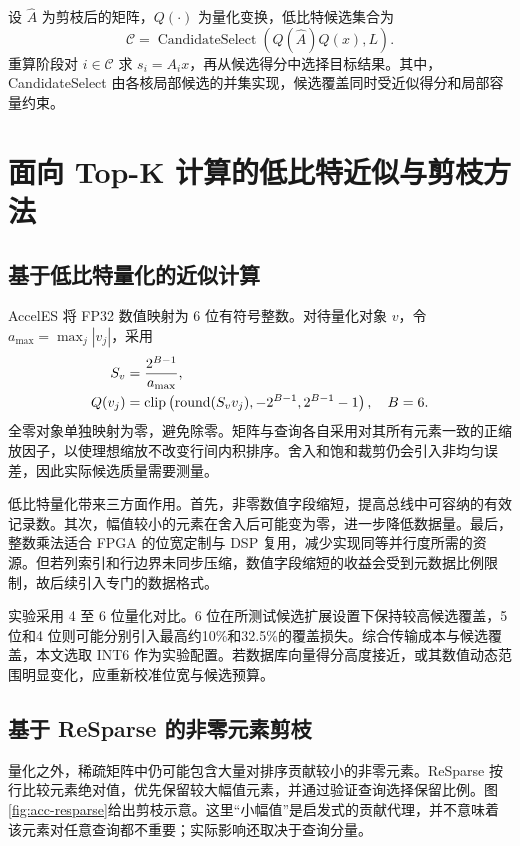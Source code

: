 设 $\widehat A$ 为剪枝后的矩阵，$Q(\cdot)$ 为量化变换，低比特候选集合为
\begin{equation}
 \mathcal{C}=\operatorname{CandidateSelect}(Q(\widehat A)Q(x),L).
\end{equation}
重算阶段对 $i\in\mathcal{C}$ 求 $s_i=A_ix$，再从候选得分中选择目标结果。其中，CandidateSelect 由各核局部候选的并集实现，候选覆盖同时受近似得分和局部容量约束。

\section{面向 Top-K 计算的低比特近似与剪枝方法}
\subsection{基于低比特量化的近似计算}
AccelES 将 FP32 数值映射为 6 位有符号整数。对待量化对象 $v$，令 $a_{\max}=\max_j|v_j|$，采用
\begin{align}
 S_v&=\frac{2^{B-1}}{a_{\max}},\\
 Q(v_j)&=\operatorname{clip}\left(\operatorname{round}(S_vv_j),-2^{B-1},2^{B-1}-1\right),\quad B=6.
 \label{eq:acc-quant}
\end{align}
全零对象单独映射为零，避免除零。矩阵与查询各自采用对其所有元素一致的正缩放因子，以使理想缩放不改变行间内积排序。舍入和饱和裁剪仍会引入非均匀误差，因此实际候选质量需要测量。

低比特量化带来三方面作用。首先，非零数值字段缩短，提高总线中可容纳的有效记录数。其次，幅值较小的元素在舍入后可能变为零，进一步降低数据量。最后，整数乘法适合 FPGA 的位宽定制与 DSP 复用，减少实现同等并行度所需的资源。但若列索引和行边界未同步压缩，数值字段缩短的收益会受到元数据比例限制，故后续引入专门的数据格式。

实验采用 4 至 6 位量化对比。6 位在所测试候选扩展设置下保持较高候选覆盖，5 位和4 位则可能分别引入最高约10\%和32.5\%的覆盖损失。综合传输成本与候选覆盖，本文选取 INT6 作为实验配置。若数据库向量得分高度接近，或其数值动态范围明显变化，应重新校准位宽与候选预算。

\subsection{基于 ReSparse 的非零元素剪枝}
量化之外，稀疏矩阵中仍可能包含大量对排序贡献较小的非零元素。ReSparse 按行比较元素绝对值，优先保留较大幅值元素，并通过验证查询选择保留比例。图\ref{fig:acc-resparse}给出剪枝示意。这里“小幅值”是启发式的贡献代理，并不意味着该元素对任意查询都不重要；实际影响还取决于查询分量。


